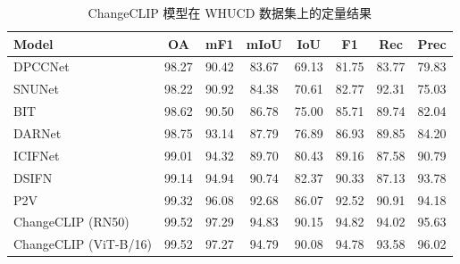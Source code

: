 \begin{table}[!htb]
  \centering
  \caption{ChangeCLIP 模型在 WHUCD 数据集上的定量结果}
  \label{tab:changeclip_whucd}
  \begin{tabular}{@{}lccccccc@{}}
    \toprule
    Model                      & OA    & mF1   & mIoU  & IoU   & F1    & Rec   & Prec   \\
    \midrule
    DPCCNet~\cite{Papadomanolaki2021ADM}                    & 98.27 & 90.42 & 83.67 & 69.13 & 81.75 & 83.77 & 79.83  \\
    SNUNet~\cite{Fang2021SNUNetCDAD}                     & 98.22 & 90.92 & 84.38 & 70.61 & 82.77 & 92.31 & 75.03  \\
    BIT~\cite{chen_remote_2022}                        & 98.62 & 90.50 & 86.78 & 75.00 & 85.71 & 89.74 & 82.04  \\
    DARNet~\cite{li_densely_2022}                     & 98.75 & 93.14 & 87.79 & 76.89 & 86.93 & 89.85 & 84.20  \\
    ICIFNet~\cite{Feng2022ICIFNetIC}                    & 99.01 & 94.32 & 89.70 & 80.43 & 89.16 & 87.58 & 90.79  \\
    DSIFN~\cite{Zhang2020ADS}                      & 99.14 & 94.94 & 90.74 & 82.37 & 90.33 & 87.13 & 93.78  \\
    P2V~\cite{lin_transition_2023}                        & 99.32 & 96.08 & 92.68 & 86.07 & 92.52 & 90.91 & 94.18  \\
    ChangeCLIP (RN50)          & 99.52 & 97.29 & 94.83 & 90.15 & 94.82 & 94.02 & 95.63  \\
    ChangeCLIP (ViT-B/16)      & 99.52 & 97.27 & 94.79 & 90.08 & 94.78 & 93.58 & 96.02  \\
    \bottomrule
  \end{tabular}
\end{table}

